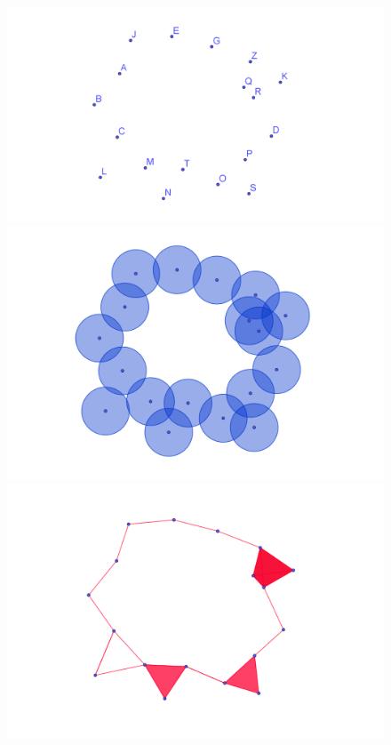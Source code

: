 \documentclass[12pt,a4paper,twoside]{article} %
\theoremstyle{plain}
\theoremstyle{definition}
\begin{document}
\begin{figure}[h!]
\centering
\includegraphics[scale=0.39]{img/puntos.png}
\includegraphics[scale=0.40]{img/cech_bolas2.png}
\includegraphics[scale=0.40]{img/cech_complex.png}

\end{figure}
\end{document}
